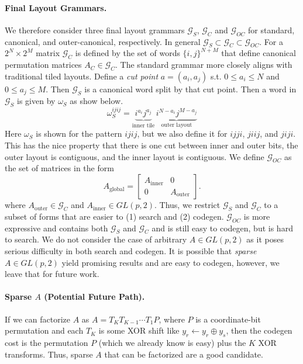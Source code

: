 \documentclass[10pt]{article}
\theoremstyle{remark}
\begin{document}
\paragraph{Final Layout Grammars.} We therefore consider three final layout grammars $\mathcal{G}_{S}$, $\mathcal{G}_{C}$ and $\mathcal{G}_{OC}$ for standard, canonical, and outer-canonical, respectively. In general $\mathcal{G}_S \subset \mathcal{G}_C \subset \mathcal{G}_{OC}$. For a $2^N \times 2^M$ matrix $\mathcal{G}_{C}$ is defined by the set of words $\{i,j\}^{N+M}$ that define canonical permutation matrices $A_C \in \mathcal{G}_C$. The standard grammar more closely aligns with traditional tiled layouts. Define a {\it cut point} $a=(a_i, a_j)$ s.t. $0
\le a_i \le N$ and $0 \le a_j \le M$. Then $\mathcal{G}_S$ is a canonical word split by that cut point. Then a word in $\mathcal{G}_S$ is given by $\omega_S$ as show below.
%
\[
    \omega^{ijij}_S = \underbrace{i^{a_i} j^{a_j}}_{\text{inner tile}} \, \underbrace{i^{N-a_i} j^{M-a_j}}_{\text{outer layout}}
\]
%
Here $\omega_S$ is shown for the pattern $ijij$, but we also define it for $ijji$, $jiij$, and $jiji$.
This has the nice property that there is one cut between inner and outer bits, the outer layout is contiguous, and the inner layout is contiguous.
%
We define $\mathcal{G}_{OC}$ as the set of matrices
in the form 
%
\[
A_{\text{global}} =
\begin{bmatrix}
A_{\text{inner}}&0\\
0&A_{\text{outer}}
\end{bmatrix}.
\]
%
where $A_{\text{outer}}\in \mathcal{G}_C$ and $A_{\text{inner}}\in GL(p,2)$. Thus, we restrict $\mathcal{G}_S$ and $\mathcal{G}_C$ to a subset of forms that are easier to (1) search and (2) codegen. $\mathcal{G}_{OC}$ is more expressive and contains both $\mathcal{G}_S$ and $\mathcal{G}_C$ and is still easy to codegen, but is hard to search. We do not consider the case of arbitrary $A\in GL(p,2)$ as it poses serious difficulty in both search and codegen. It is possible that {\it sparse} $A\in GL(p,2)$ yield promising results and are easy to codegen, however, we leave that for future work.

\paragraph{Sparse $A$ (Potential Future Path).} If we can factorize $A$ as $A=T_K T_{K-1}\cdots T_1 P$, where $P$ is a coordinate-bit permutation and each $T_K$ is some XOR shift like $y_r \leftarrow y_r \oplus y_s$, then the codegen cost is the permutation $P$ (which we already know is easy) plus the $K$ XOR transforms. Thus, sparse $A$ that can be factorized are a good candidate.
\end{document}
